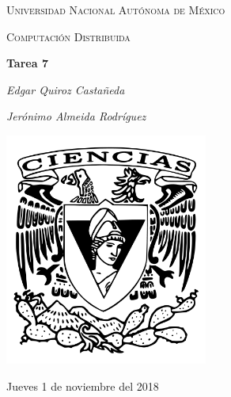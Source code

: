 \documentclass[12pt,a4paper]{report}
\begin{document}
\begin{titlepage}
	\centering
	{\scshape\LARGE Universidad Nacional Autónoma de México \par}
	\vspace{1cm}
	{\scshape\Large Computación Distribuida\par}
	\vspace{1.5cm}
	{\huge\bfseries Tarea 7\par}
	\vspace{.5cm}
	{\Large\itshape Edgar Quiroz Castañeda \par}
	\vspace{.5cm}
	{\Large\itshape Jerónimo Almeida Rodríguez \par}
	\vfill
	 \includegraphics[width=0.5\textwidth]{escudo_f-ciencias.png}
	\vfill

	{\large Jueves 1 de noviembre del 2018 \par}
\end{titlepage}

\pagebreak
\setlength{\voffset}{-0.75in}
\setlength{\headsep}{5pt}
\end{document}
